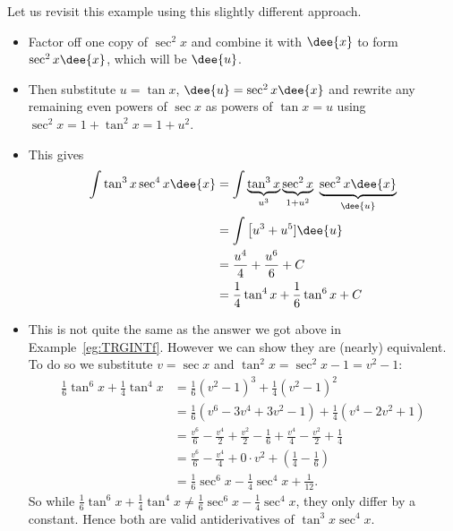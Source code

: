 \begin{eg}\label{eg:TRGINTfredux}
\soln Let us revisit this example using this slightly different approach.
\begin{itemize}
 \item Factor off one copy of $\sec^2 x$ and combine it with $\dee{x}$
to form $\sec^2 x\dee{x}$, which will be $\dee{u}$.
\item Then substitute $u=\tan x$, $\dee{u}=\sec^2 x\dee{x}$ and rewrite any remaining even
powers of $\sec x$ as powers of $\tan x=u$ using $\sec^2x = 1+\tan^2 x=1+u^2$.
\item This gives
\begin{align*}
\int \tan^3x \sec^4 x\dee{x}
&= \int \underbrace{\tan^3x}_{u^3} \underbrace{\sec^2 x}_{1+u^2}\
        \underbrace{\sec^2 x\dee{x}}_{\dee{u}}  \\
&= \int \big[u^3+u^5]\dee{u} \\
&=\frac{u^4}{4}+ \frac{u^6}{6} + C \\
&=\frac{1}{4}\tan^4 x+\frac{1}{6}\tan^6 x + C
\end{align*}
\item This is not quite the same as the answer we got above in
Example~\ref{eg:TRGINTf}. However we can show they are (nearly) equivalent. To
do so we substitute $v=\sec x$ and $\tan^2x=\sec^2x-1 = v^2-1$:
\begin{align*}
  \frac{1}{6}\tan^6x + \frac{1}{4}\tan^4x
  &= \frac{1}{6} (v^2-1)^3 + \frac{1}{4}(v^2-1)^2 \\
  &= \frac{1}{6} (v^6-3v^4+3v^2-1) + \frac{1}{4} (v^4-2v^2+1) \\
  &= \frac{v^6}{6} - \frac{v^4}{2} + \frac{v^2}{2} - \frac{1}{6} + \frac{v^4}{4} -
\frac{v^2}{2} + \frac{1}{4} \\
  &= \frac{v^6}{6} -\frac{v^4}{4} + 0 \cdot v^2 + \left(\frac{1}{4}-\frac{1}{6}\right)\\
  &= \frac{1}{6}\sec^6x - \frac{1}{4}\sec^4x + \frac{1}{12}.
\end{align*}
So while $\frac{1}{6}\tan^6x + \frac{1}{4}\tan^4x \neq \frac{1}{6}\sec^6x -
\frac{1}{4}\sec^4x$, they only differ by a constant. Hence both are valid antiderivatives
of $\tan^3 x\sec^4x$.
\end{itemize}

\end{eg}

